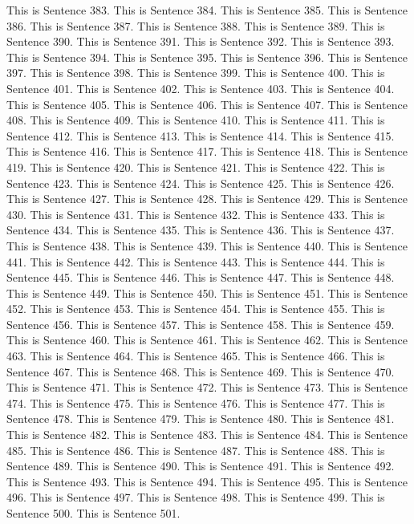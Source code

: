 \documentclass{article}
\begin{document}
This is Sentence 383.
This is Sentence 384.
This is Sentence 385.
This is Sentence 386.
This is Sentence 387.
This is Sentence 388.
This is Sentence 389.
This is Sentence 390.
This is Sentence 391.
This is Sentence 392.
This is Sentence 393.
This is Sentence 394.
This is Sentence 395.
This is Sentence 396.
This is Sentence 397.
This is Sentence 398.
This is Sentence 399.
This is Sentence 400.
This is Sentence 401.
This is Sentence 402.
This is Sentence 403.
This is Sentence 404.
This is Sentence 405.
This is Sentence 406.
This is Sentence 407.
This is Sentence 408.
This is Sentence 409.
This is Sentence 410.
This is Sentence 411.
This is Sentence 412.
This is Sentence 413.
This is Sentence 414.
This is Sentence 415.
This is Sentence 416.
This is Sentence 417.
This is Sentence 418.
This is Sentence 419.
This is Sentence 420.
This is Sentence 421.
This is Sentence 422.
This is Sentence 423.
This is Sentence 424.
This is Sentence 425.
This is Sentence 426.
This is Sentence 427.
This is Sentence 428.
This is Sentence 429.
This is Sentence 430.
This is Sentence 431.
This is Sentence 432.
This is Sentence 433.
This is Sentence 434.
This is Sentence 435.
This is Sentence 436.
This is Sentence 437.
This is Sentence 438.
This is Sentence 439.
This is Sentence 440.
This is Sentence 441.
This is Sentence 442.
This is Sentence 443.
This is Sentence 444.
This is Sentence 445.
This is Sentence 446.
This is Sentence 447.
This is Sentence 448.
This is Sentence 449.
This is Sentence 450.
This is Sentence 451.
This is Sentence 452.
This is Sentence 453.
This is Sentence 454.
This is Sentence 455.
This is Sentence 456.
This is Sentence 457.
This is Sentence 458.
This is Sentence 459.
This is Sentence 460.
This is Sentence 461.
This is Sentence 462.
This is Sentence 463.
This is Sentence 464.
This is Sentence 465.
This is Sentence 466.
This is Sentence 467.
This is Sentence 468.
This is Sentence 469.
This is Sentence 470.
This is Sentence 471.
This is Sentence 472.
This is Sentence 473.
This is Sentence 474.
This is Sentence 475.
This is Sentence 476.
This is Sentence 477.
This is Sentence 478.
This is Sentence 479.
This is Sentence 480.
This is Sentence 481.
This is Sentence 482.
This is Sentence 483.
This is Sentence 484.
This is Sentence 485.
This is Sentence 486.
This is Sentence 487.
This is Sentence 488.
This is Sentence 489.
This is Sentence 490.
This is Sentence 491.
This is Sentence 492.
This is Sentence 493.
This is Sentence 494.
This is Sentence 495.
This is Sentence 496.
This is Sentence 497.
This is Sentence 498.
This is Sentence 499.
This is Sentence 500.
This is Sentence 501.
\end{document}
